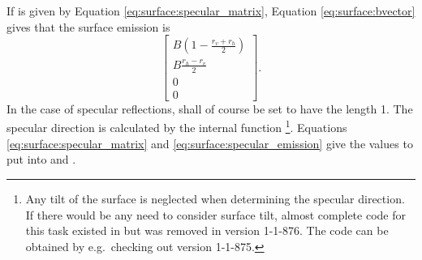 If  is given by Equation \ref{eq:surface:specular_matrix},
Equation \ref{eq:surface:bvector} gives that the surface emission  is
\begin{equation}
  \label{eq:surface:specular_emission}
   \left[\begin{array}{c}
     B\left(1-\frac{r_v+r_h}{2}\right) \\
     B\frac{r_h-r_v}{2} \\
     0\\0
   \end{array}\right].
\end{equation}
In the case of specular reflections,  shall of
course be set to have the length 1. The specular direction is
calculated by the internal function
\footnote{Any tilt of the surface is
  neglected when determining the specular direction. If there would be
  any need to consider surface tilt, almost complete code for this
  task existed in  but was removed
  in version 1-1-876. The code can be obtained by e.g.\ checking out
  version 1-1-875.}.  Equations \ref{eq:surface:specular_matrix} and
\ref{eq:surface:specular_emission} give the values to put into
 and .



 




